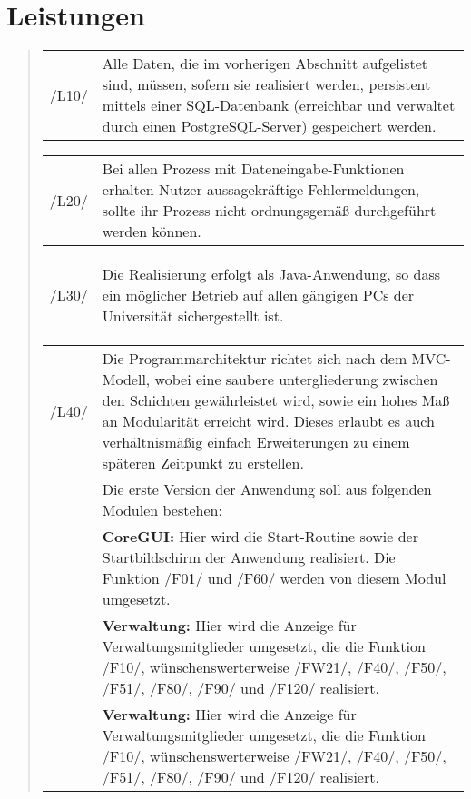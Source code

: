 \section{Leistungen}

\begin{quote}
\begin{tabular}{p{1cm}p{12cm}}


	 /L10/	& Alle Daten, die im vorherigen Abschnitt aufgelistet sind, müssen, sofern sie realisiert werden, persistent mittels einer SQL-Datenbank (erreichbar und verwaltet durch einen PostgreSQL-Server) gespeichert werden. \\[0.25cm]
	 
\end{tabular}
\begin{tabular}{p{1cm}p{12cm}}
						
	 /L20/	& Bei allen Prozess mit Dateneingabe-Funktionen erhalten Nutzer aussagekräftige Fehlermeldungen, sollte ihr Prozess nicht ordnungsgemäß durchgeführt werden können. \\[0.25cm]
	 
\end{tabular}
\begin{tabular}{p{1cm}p{12cm}}
						
	 /L30/	& Die Realisierung erfolgt als Java-Anwendung, so dass ein möglicher Betrieb auf allen gängigen PCs der Universität sichergestellt ist. \\[0.25cm]

\end{tabular}
\begin{tabular}{p{1cm}p{12cm}}
						
	 /L40/	& Die Programmarchitektur richtet sich nach dem MVC-Modell, wobei eine saubere untergliederung zwischen den Schichten gewährleistet wird, sowie ein hohes Maß an Modularität erreicht wird. Dieses erlaubt es auch verhältnismäßig einfach Erweiterungen zu einem späteren Zeitpunkt zu erstellen. \\
	 &	Die erste Version der Anwendung soll aus folgenden Modulen bestehen: \\
	 &	\textbf{CoreGUI:} Hier wird die Start-Routine sowie der Startbildschirm der Anwendung realisiert. Die Funktion /F01/ und /F60/ werden von diesem Modul umgesetzt.\\
	 &	\textbf{Verwaltung:} Hier wird die Anzeige für Verwaltungsmitglieder umgesetzt, die die Funktion /F10/, wünschenswerterweise /FW21/, /F40/, /F50/, /F51/, /F80/, /F90/ und /F120/ realisiert.\\
	 &	\textbf{Verwaltung:} Hier wird die Anzeige für Verwaltungsmitglieder umgesetzt, die die Funktion /F10/, wünschenswerterweise /FW21/, /F40/, /F50/, /F51/, /F80/, /F90/ und /F120/ realisiert.\\[0.25cm]


\end{tabular}
\end{quote}

